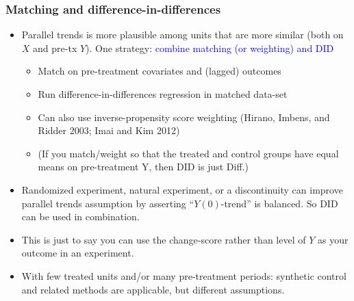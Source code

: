\documentclass[xcolor=dvipsnames]{beamer}
\begin{document}
\begin{frame}
  \frametitle{Matching and difference-in-differences}
\begin{itemize}
\small
\item<1-> Parallel trends is more plausible among units that are more similar (both on $X$ and pre-tx $Y$). One strategy:  \textcolor{Blue}{combine matching (or weighting) and DID}\\
\medskip
\begin{itemize}
  \item<3-> Match on pre-treatment covariates and (lagged) outcomes\medskip
  \item<4-> Run difference-in-differences regression in matched data-set\medskip
  \item<5-> Can also use inverse-propensity score weighting (Hirano, Imbens, and Ridder 2003; Imai and Kim 2012)\medskip
  \item<6-> (If you match/weight so that the treated and control groups have equal means on pre-treatment Y, then DID is just Diff.) 
\end{itemize}\bigskip
\item<6-> Randomized experiment, natural experiment, or a  discontinuity can improve parallel trends assumption by asserting ``$Y(0)$-trend'' is balanced. So DID can be used in combination.
\item<7-> This is just to say you can use the change-score rather than level of $Y$ as your outcome in an experiment.\item<7-> With few treated units and/or many pre-treatment periods: synthetic control and related methods are applicable, but different assumptions.
\end{itemize}
\end{frame}
\end{document}
